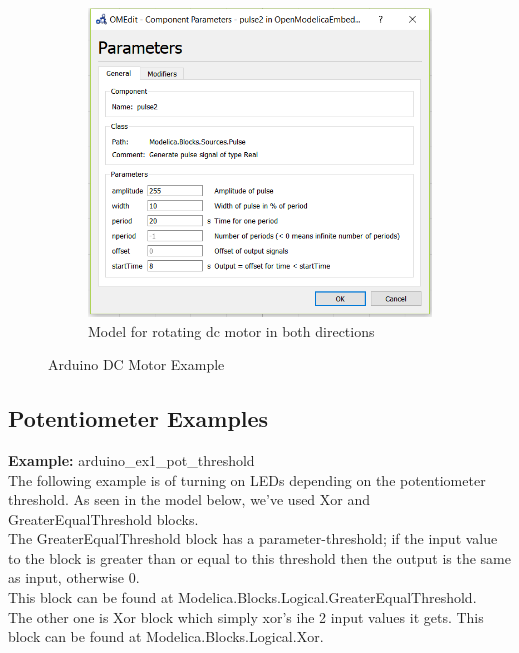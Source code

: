 \documentclass[12pt,a4paper]{report}
\begin{document}
\begin{figure}[H]
\begin{subfigure}{\textwidth}
\includegraphics[width =0.3\linewidth]{dc_ex2_3}
\caption{Model for rotating dc motor in both directions}
\end{subfigure}
\caption {Arduino DC Motor Example}
\label{figure:17}
\end{figure}

\subsection{Potentiometer Examples}
\textbf{Example:} arduino\_ex1\_pot\_threshold\\

The following example is of turning on LEDs depending on the potentiometer threshold. As seen in the model below, we’ve used Xor and GreaterEqualThreshold blocks. \\

The GreaterEqualThreshold block has a parameter-threshold; if the input value to the block is greater than or equal to this threshold then the output is the same as input, otherwise 0.\\

This block can be found at Modelica.Blocks.Logical.GreaterEqualThreshold.\\

The other one is Xor block which simply xor’s ihe 2 input values it gets. This block can be found at Modelica.Blocks.Logical.Xor.
\end{document}
